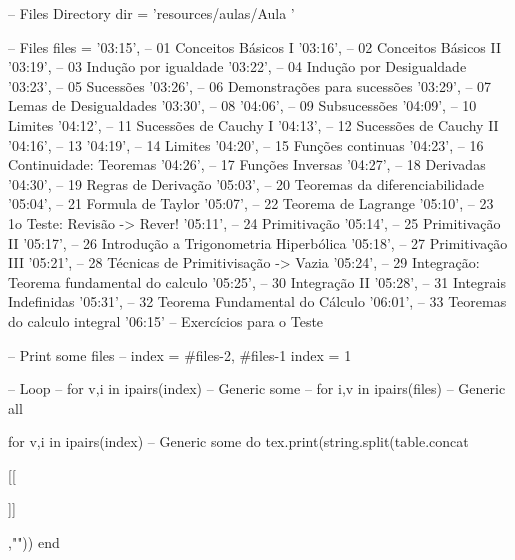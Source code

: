 \documentclass{article}
\begin{document}
\begin{luacode*}

    -- Files Directory
    dir = 'resources/aulas/Aula '

    -- Files
    files = {
        '03:15', -- 01 Conceitos Básicos I
        '03:16', -- 02 Conceitos Básicos II
        '03:19', -- 03 Indução por igualdade
        '03:22', -- 04 Indução por Desigualdade
        '03:23', -- 05 Sucessões
        '03:26', -- 06 Demonstrações para sucessões
        '03:29', -- 07 Lemas de Desigualdades
        '03:30', -- 08
        '04:06', -- 09 Subsucessões
        '04:09', -- 10 Limites
        '04:12', -- 11 Sucessões de Cauchy I
        '04:13', -- 12 Sucessões de Cauchy II
        '04:16', -- 13
        '04:19', -- 14 Limites
        '04:20', -- 15 Funções continuas
        '04:23', -- 16 Continuidade: Teoremas
        '04:26', -- 17 Funções Inversas
        '04:27', -- 18 Derivadas
        '04:30', -- 19 Regras de Derivação
        '05:03', -- 20 Teoremas da diferenciabilidade
        '05:04', -- 21 Formula de Taylor
        '05:07', -- 22 Teorema de Lagrange
        '05:10', -- 23 1o Teste: Revisão    -> Rever!
        '05:11', -- 24 Primitivação
        '05:14', -- 25 Primitivação II
        '05:17', -- 26 Introdução a Trigonometria Hiperbólica
        '05:18', -- 27 Primitivação III
        '05:21', -- 28 Técnicas de Primitivisação    -> Vazia
        '05:24', -- 29 Integração: Teorema fundamental do calculo
        '05:25', -- 30 Integração II
        '05:28', -- 31 Integrais Indefinidas
        '05:31', -- 32 Teorema Fundamental do Cálculo
        '06:01', -- 33 Teoremas do calculo integral
        '06:15'  -- Exercícios para o Teste
    }

    -- Print some files
    -- index = {#files-2, #files-1}
    index = {1}

    -- Loop
    -- for v,i in ipairs(index)    -- Generic some
    -- for i,v in ipairs(files)    -- Generic all

    for v,i in ipairs(index)    -- Generic some
    do
        tex.print(string.split(table.concat{[[
            
        ]]},"\n"))
    end

\end{luacode*}
\end{document}
